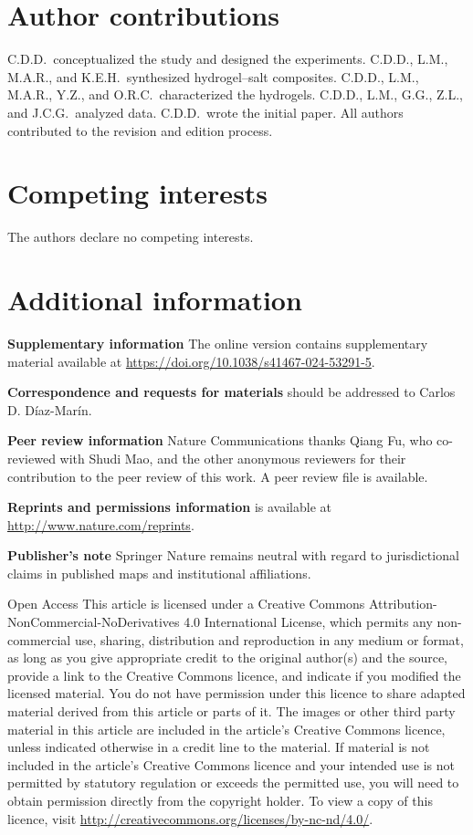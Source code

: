 \documentclass[11pt]{article}
\begin{document}
\section*{Author contributions}
C.D.D.\ conceptualized the study and designed the experiments. C.D.D., L.M., M.A.R., and K.E.H.\ synthesized hydrogel--salt composites. C.D.D., L.M., M.A.R., Y.Z., and O.R.C.\ characterized the hydrogels. C.D.D., L.M., G.G., Z.L., and J.C.G.\ analyzed data. C.D.D.\ wrote the initial paper. All authors contributed to the revision and edition process.

\section*{Competing interests}
The authors declare no competing interests.

\section*{Additional information}
\textbf{Supplementary information} The online version contains supplementary material available at \url{https://doi.org/10.1038/s41467-024-53291-5}.

\textbf{Correspondence and requests for materials} should be addressed to Carlos D. D\'iaz-Mar\'in.

\textbf{Peer review information} Nature Communications thanks Qiang Fu, who co-reviewed with Shudi Mao, and the other anonymous reviewers for their contribution to the peer review of this work. A peer review file is available.

\textbf{Reprints and permissions information} is available at \url{http://www.nature.com/reprints}.

\textbf{Publisher's note} Springer Nature remains neutral with regard to jurisdictional claims in published maps and institutional affiliations.

\bigskip
\noindent Open Access This article is licensed under a Creative Commons Attribution-NonCommercial-NoDerivatives 4.0 International License, which permits any non-commercial use, sharing, distribution and reproduction in any medium or format, as long as you give appropriate credit to the original author(s) and the source, provide a link to the Creative Commons licence, and indicate if you modified the licensed material. You do not have permission under this licence to share adapted material derived from this article or parts of it. The images or other third party material in this article are included in the article's Creative Commons licence, unless indicated otherwise in a credit line to the material. If material is not included in the article's Creative Commons licence and your intended use is not permitted by statutory regulation or exceeds the permitted use, you will need to obtain permission directly from the copyright holder. To view a copy of this licence, visit \url{http://creativecommons.org/licenses/by-nc-nd/4.0/}.
\end{document}

